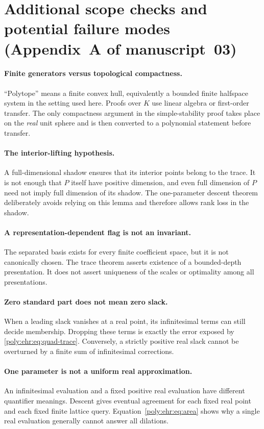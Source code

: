 \documentclass[11pt,a4paper]{article}
\numberwithin{equation}{section}
\theoremstyle{plain}
\begin{document}
\section{Additional scope checks and potential failure modes (Appendix~A of manuscript~03)}\label{poly:ehr:app:scope}

\paragraph{Finite generators versus topological compactness.}
``Polytope'' means a finite convex hull, equivalently a bounded finite
halfspace system in the setting used here. Proofs over $K$ use linear
algebra or first-order transfer. The only compactness argument in the
simple-stability proof takes place on the \emph{real} unit sphere and is
then converted to a polynomial statement before transfer.

\paragraph{The interior-lifting hypothesis.}
A full-dimensional shadow ensures that its interior points belong to the
trace. It is not enough that $P$ itself have positive dimension, and even
full dimension of $P$ need not imply full dimension of its shadow. The
one-parameter descent theorem deliberately avoids relying on this lemma
and therefore allows rank loss in the shadow.

\paragraph{A representation-dependent flag is not an invariant.}
The separated basis exists for every finite coefficient space, but it is
not canonically chosen. The trace theorem asserts existence of a bounded-depth
presentation. It does not assert uniqueness of the scales or optimality
among all presentations.

\paragraph{Zero standard part does not mean zero slack.}
When a leading slack vanishes at a real point, its infinitesimal terms can
still decide membership. Dropping these terms is exactly the error exposed
by \eqref{poly:ehr:eq:quad-trace}. Conversely, a strictly positive real slack
cannot be overturned by a finite sum of infinitesimal corrections.

\paragraph{One parameter is not a uniform real approximation.}
An infinitesimal evaluation and a fixed positive real evaluation have
different quantifier meanings. Descent gives eventual agreement for each
fixed real point and each fixed finite lattice query. Equation~\eqref{poly:ehr:eq:area}
shows why a single real evaluation generally cannot answer all dilations.
\end{document}

